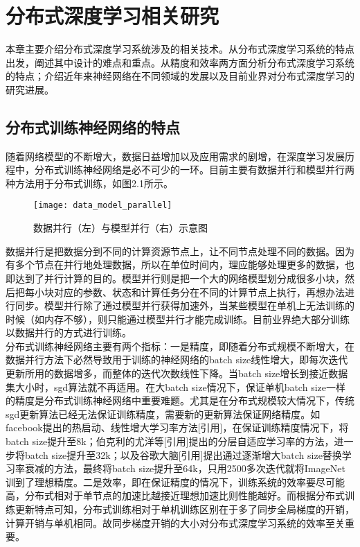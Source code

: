 \chapter{分布式深度学习相关研究}
本章主要介绍分布式深度学习系统涉及的相关技术。从分布式深度学习系统的特点出发，阐述其中设计的难点和重点。从精度和效率两方面分析分布式深度学习系统的特点；介绍近年来神经网络在不同领域的发展以及目前业界对分布式深度学习的研究进展。
\section{分布式训练神经网络的特点}
随着网络模型的不断增大，数据日益增加以及应用需求的剧增，在深度学习发展历程中，分布式训练神经网络是必不可少的一环。目前主要有数据并行和模型并行两种方法用于分布式训练，如图2.1所示。\\
\begin{figure}[htp]
\centering
\texttt{[image: data\_model\_parallel]}
\caption{数据并行（左）与模型并行（右）示意图}
\end{figure}
数据并行是把数据分到不同的计算资源节点上，让不同节点处理不同的数据。因为有多个节点在并行地处理数据，所以在单位时间内，理应能够处理更多的数据，也即达到了并行计算的目的。模型并行则是把一个大的网络模型划分成很多小块，然后把每小块对应的参数、状态和计算任务分在不同的计算节点上执行，再想办法进行同步。模型并行除了通过模型并行获得加速外，当某些模型在单机上无法训练的时候（如内存不够），则只能通过模型并行才能完成训练。目前业界绝大部分训练以数据并行的方式进行训练。\\
分布式训练神经网络主要有两个指标：一是精度，即随着分布式规模不断增大，在数据并行方法下必然导致用于训练的神经网络的batch size线性增大，即每次迭代更新所用的数据增多，而整体的迭代次数线性下降。当batch size增长到接近数据集大小时，sgd算法就不再适用。在大batch size情况下，保证单机batch size一样的精度是分布式训练神经网络中重要难题。尤其是在分布式规模较大情况下，传统sgd更新算法已经无法保证训练精度，需要新的更新算法保证网络精度。如facebook提出的热启动、线性增大学习率方法[引用]，在保证训练精度情况下，将batch size提升至8k；伯克利的尤洋等[引用]提出的分层自适应学习率的方法，进一步将batch size提升至32k；以及谷歌大脑[引用]提出通过逐渐增大batch size替换学习率衰减的方法，最终将batch size提升至64k，只用2500多次迭代就将ImageNet训到了理想精度。二是效率，即在保证精度的情况下，训练系统的效率要尽可能高，分布式相对于单节点的加速比越接近理想加速比则性能越好。而根据分布式训练更新特点可知，分布式训练相对于单机训练区别在于多了同步全局梯度的开销，计算开销与单机相同。故同步梯度开销的大小对分布式深度学习系统的效率至关重要。\\
